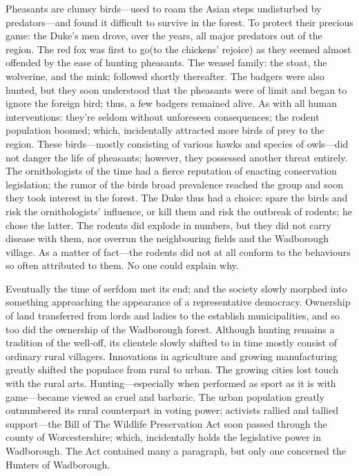 Pheasants are clumsy birds---used to roam the Asian steps undisturbed by predators---and found it difficult to survive in the forest. To protect their precious game: the Duke's men drove, over the years, all major predators out of the region. The red fox was first to go(to the chickens' rejoice) as they seemed almost offended by the ease of hunting pheasants. The weasel family: the stoat, the wolverine, and the mink; followed shortly thereafter. The badgers were also hunted, but they soon understood that the pheasants were of limit and began to ignore the foreign bird; thus, a few badgers remained alive. As with all human interventions: they're seldom without unforeseen consequences; the rodent population boomed; which, incidentally attracted more birds of prey to the region. These birds---mostly consisting of various hawks and species of owls---did not danger the life of pheasants; however, they possessed another threat entirely. The ornithologists of the time had a fierce reputation of enacting conservation legislation; the rumor of the birds broad prevalence reached the group and soon they took interest in the forest. The Duke thus had a choice: spare the birds and risk the ornithologists' influence, or kill them and risk the outbreak of rodents; he chose the latter. The rodents did explode in numbers, but they did not carry disease with them, nor overrun the neighbouring fields and the Wadborough village. As a matter of fact---the rodents did not at all conform to the behaviours so often attributed to them. No one could explain why.

Eventually the time of serfdom met its end; and the society slowly morphed into something approaching the appearance of a representative democracy. Ownership of land transferred from lords and ladies to the establish municipalities, and so too did the ownership of the Wadborough forest. Although hunting remains a tradition of the well-off, its clientele slowly shifted to in time mostly consist of ordinary rural villagers.   
Innovations in agriculture and growing manufacturing greatly shifted the populace from rural to urban. The growing cities lost touch with the rural arts. Hunting---especially when performed as sport as it is with game---became viewed as cruel and barbaric. The urban population greatly outnumbered its rural counterpart in voting power; activists rallied and tallied support---the Bill of The Wildlife Preservation Act soon passed through the county of Worcestershire; which, incidentally holds the legislative power in Wadborough. The Act contained many a paragraph, but only one concerned the Hunters of Wadborough. 

